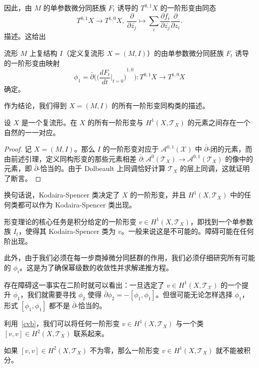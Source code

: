 因此，由 $M$ 的单参数微分同胚族 $F_t$ 诱导的 $T^{0,1}X$ 的一阶形变由同态\[
    T^{0,1}X\longrightarrow T^{1,0}X,\ \frac{\partial}{\partial\bar{z_j}}\longmapsto \sum_i \frac{\partial f_i}{\partial \bar{z_j}}\frac{\partial}{\partial z_i}.
\]描述。这给出

\begin{lemma}
    流形 $M$ 上复结构 $I$（定义复流形 $X=(M,I)$）的由单参数微分同胚族 $F_t$ 诱导的一阶形变由映射\[
        \phi_1=\bar{\partial}\bigg({\big(\frac{dF_t}{dt}|_{t=0}\big)}^{1,0}\bigg):T^{0,1}X\longrightarrow T^{1,0}X
    \]确定。
\end{lemma}

作为结论，我们得到 $X=(M,I)$ 的所有一阶形变同构类的描述。

\begin{proposition}
    设 $X$ 是一个复流形。在 $X$ 的所有一阶形变与 $H^1(X,\mathcal{T}_X)$ 的元素之间存在一个自然的一一对应。
\end{proposition}

\begin{proof}
    记 $X=(M,I)$。那么 $I$ 的一阶形变对应于 $\mathcal{A}^{0,1}(\mathcal{X})$ 中 $\bar{\partial}$-闭的元素，而由前述引理，定义同构形变的那些元素相差 $\bar{\partial}:\mathcal{A}^{0}(\mathcal{T}_X)\rightarrow\mathcal{A}^{0,1}(\mathcal{T}_X)$ 的像中的元素，即 $\bar{\partial}$-恰当的。由于 Dolbeault 上同调恰好计算 $\mathcal{T}_X$ 的层上同调，这就证明了断言。
\end{proof}

换句话说，Kodaira-Spencer 类决定了 $X$ 的一阶形变，并且 $H^1(X,\mathcal{T}_X)$ 中的任何类都可以作为 Kodaira-Spencer 类出现。

形变理论的核心任务是积分给定的一阶形变 $v\in H^1(X,\mathcal{T}_X)$，即找到一个单参数族 $I_t$，使得其 Kodaira-Spencer 类为 $v$。一般来说这是不可能的。障碍可能在任何阶出现。

此外，由于我们必须在每一步商掉微分同胚群的作用，我们必须仔细研究所有可能的 $\phi_i$。这是为了确保幂级数的收敛性并求解递推方程。

存在障碍这一事实在二阶时就可以看出：一旦选定了 $v\in H^1(X,\mathcal{T_X})$ 的一个提升 $\phi_1$，我们就需要寻找 $\phi_2$ 使得 $\bar{\partial}\phi_2=-[\phi_1,\phi_1]$。但很可能无论怎样选择 $\phi_1$，形式 $[\phi_1,\phi_1]$ 都不是 $\bar{\partial}$-恰当的。

利用~\ref{cvb}，我们可以将任何一阶形变 $v\in H^1(X,\mathcal{T}_X)$ 与一个类 $[v,v]\in H^2(X,\mathcal{T}_X)$ 联系起来。

\begin{corollary}
    如果 $[v,v]\in H^2(X,\mathcal{T}_X)$ 不为零，那么一阶形变 $v\in H^1(X,\mathcal{T}_X)$ 就不能被积分。
\end{corollary}

